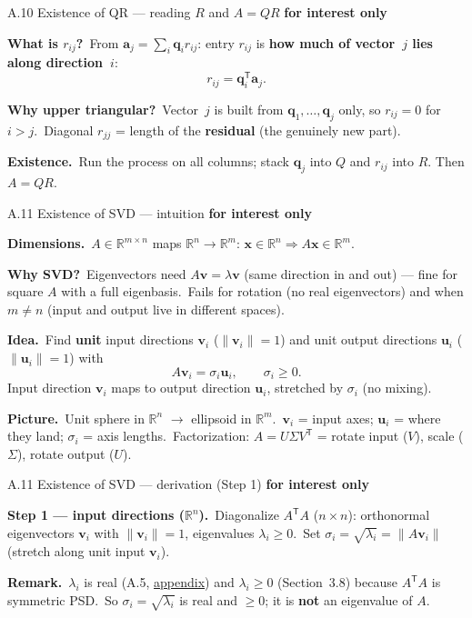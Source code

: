 \documentclass[11pt,aspectratio=169]{beamer}
\newcommand{\InterestOnly}{\textcolor{mAccent}{\textbf{for interest only}}}
\newcommand{\AppendixLink}[1]{%
  \hyperlink{#1}{\textcolor{mAccent}{appendix}}}
\begin{document}
\begin{frame}{A.10 Existence of QR --- reading $R$ and $A=QR$}
  \footnotesize
  \InterestOnly

  \medskip
  \textbf{What is $r_{ij}$?}\
  From $\mathbf{a}_j=\sum_i \mathbf{q}_i r_{ij}$: entry $r_{ij}$ is \textbf{how much of vector~$j$ lies along direction~$i$}:
  \[
    r_{ij}=\mathbf{q}_i^{\mathsf T}\mathbf{a}_j.
  \]

  \medskip
  \textbf{Why upper triangular?}\
  Vector~$j$ is built from $\mathbf{q}_1,\ldots,\mathbf{q}_j$ only, so $r_{ij}=0$ for $i>j$.\
  Diagonal $r_{jj}$ = length of the \textbf{residual} (the genuinely new part).

  \medskip
  \textbf{Existence.}\
  Run the process on all columns; stack $\mathbf{q}_j$ into $Q$ and $r_{ij}$ into $R$. Then $A=QR$.
\end{frame}

\begin{frame}{A.11 Existence of SVD --- intuition}
  \hypertarget{sec:svd-exists}{}
  \footnotesize
  \InterestOnly

  \medskip
  \textbf{Dimensions.}\
  $A\in\mathbb{R}^{m\times n}$ maps $\mathbb{R}^n\to\mathbb{R}^m$:
  $\mathbf{x}\in\mathbb{R}^n \Rightarrow A\mathbf{x}\in\mathbb{R}^m$.

  \medskip
  \textbf{Why SVD?}\
  Eigenvectors need $A\mathbf{v}=\lambda\mathbf{v}$ (same direction in and out) --- fine for square $A$ with a full eigenbasis.\
  Fails for rotation (no real eigenvectors) and when $m\neq n$ (input and output live in different spaces).

  \medskip
  \textbf{Idea.}\
  Find \textbf{unit} input directions $\mathbf{v}_i$ ($\|\mathbf{v}_i\|=1$) and unit output directions $\mathbf{u}_i$ ($\|\mathbf{u}_i\|=1$) with
  \[
    A\mathbf{v}_i=\sigma_i\mathbf{u}_i,
    \qquad \sigma_i\ge 0.
  \]
  Input direction $\mathbf{v}_i$ maps to output direction $\mathbf{u}_i$, stretched by $\sigma_i$ (no mixing).

  \medskip
  \textbf{Picture.}\
  Unit sphere in $\mathbb{R}^n$ $\to$ ellipsoid in $\mathbb{R}^m$.\
  $\mathbf{v}_i$ = input axes; $\mathbf{u}_i$ = where they land; $\sigma_i$ = axis lengths.\
  Factorization: $A=U\Sigma V^{\mathsf T}$ = rotate input ($V$), scale ($\Sigma$), rotate output ($U$).
\end{frame}

\begin{frame}{A.11 Existence of SVD --- derivation (Step 1)}
  \footnotesize
  \InterestOnly

  \medskip
  \textbf{Step 1 --- input directions ($\mathbb{R}^n$).}\
  Diagonalize $A^{\mathsf T}A$ ($n\times n$): orthonormal eigenvectors $\mathbf{v}_i$ with $\|\mathbf{v}_i\|=1$, eigenvalues $\lambda_i\ge 0$.\
  Set $\sigma_i=\sqrt{\lambda_i}=\|A\mathbf{v}_i\|$ (stretch along unit input $\mathbf{v}_i$).

  \medskip
  {\scriptsize \textbf{Remark.}\
  $\lambda_i$ is real (A.5, \AppendixLink{sec:symmetric-real-eigenvalues}) and $\lambda_i\ge 0$ (Section~3.8) because $A^{\mathsf T}A$ is symmetric PSD.\
  So $\sigma_i=\sqrt{\lambda_i}$ is real and $\ge 0$; it is \textbf{not} an eigenvalue of $A$.}
\end{frame}
\end{document}
